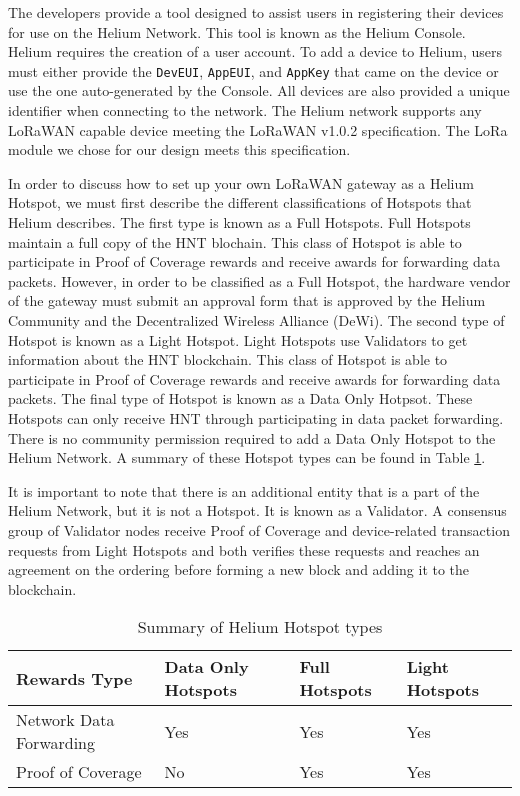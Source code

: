 The developers provide a tool designed to assist users in registering their devices for use on the Helium Network. This tool is known as the Helium Console. Helium requires the creation of a user account. To add a device to Helium, users must either provide the \texttt{DevEUI}, \texttt{AppEUI}, and \texttt{AppKey} that came on the device or use the one auto-generated by the Console. All devices are also provided a unique identifier when connecting to the network. The Helium network supports any LoRaWAN capable device meeting the LoRaWAN v1.0.2 specification. The LoRa module we chose for our design meets this specification.

In order to discuss how to set up your own LoRaWAN gateway as a Helium Hotspot, we must first describe the different classifications of Hotspots that Helium describes. The first type is known as a Full Hotspots. Full Hotspots maintain a full copy of the HNT blochain. This class of Hotspot is able to participate in Proof of Coverage rewards and receive awards for forwarding data packets. However, in order to be classified as a Full Hotspot, the hardware vendor of the gateway must submit an approval form that is approved by the Helium Community and the Decentralized Wireless Alliance (DeWi). The second type of Hotspot is known as a Light Hotspot. Light Hotspots use Validators to get information about the HNT blockchain. This class of Hotspot is able to participate in Proof of Coverage rewards and receive awards for forwarding data packets. The final type of Hotspot is known as a Data Only Hotpsot. These Hotspots can only receive HNT through participating in data packet forwarding. There is no community permission required to add a Data Only Hotspot to the Helium Network. A summary of these Hotspot types can be found in Table \ref{tab:helium-hotspot-classes}.

It is important to note that there is an additional entity that is a part of the Helium Network, but it is not a Hotspot. It is known as a Validator. A consensus group of Validator nodes receive Proof of Coverage and device-related transaction requests from Light Hotspots and both verifies these requests and reaches an agreement on the ordering before forming a new block and adding it to the blockchain.

\begin{table}
\centering
\caption{Summary of Helium Hotspot types}
\begin{tabular}{|l|l|l|l|}
\hline
Rewards Type & Data Only Hotspots & Full Hotspots & Light Hotspots \\
\hline\hline
Network Data Forwarding & Yes & Yes & Yes \\\hline
Proof of Coverage & No & Yes & Yes \\\hline
\end{tabular}
\label{tab:helium-hotspot-classes}
\end{table}

